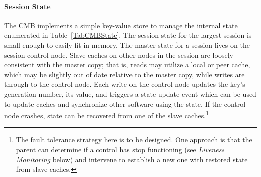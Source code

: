 \paragraph{Session State}
The CMB implements a simple key-value store to manage the
internal state enumerated in Table~\ref{TabCMBState}.
The session state for the largest session is small enough to easily
fit in memory.
The master state for a session lives on the session control node.
Slave caches on other nodes in the session are loosely consistent with
the master copy; that is, reads may utilize a local or peer cache,
which may be slightly out of date relative to the master copy,
while writes are through to the control node.
Each write on the control node updates the key's generation number,
its value, and triggers a state update event which
can be used to update caches and synchronize other software using the
state.  If the control node crashes, state can be recovered from
one of the slave caches.\footnote{The fault tolerance strategy here is to
be designed.  One approach is that the parent can determine if a control
has stop functioning (see {\em Liveness Monitoring} below) and intervene
to establish a new one with restored state from slave caches.}

